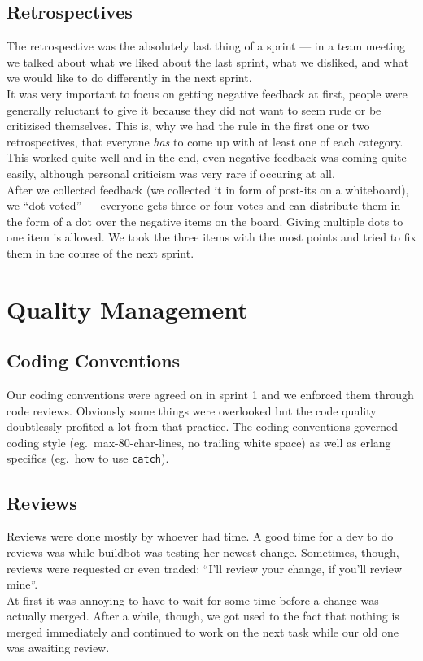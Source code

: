 \documentclass[11pt,a4paper]{report}
\begin{document}
\subsection{Retrospectives}
The retrospective was the absolutely last thing of a sprint --- in a team
meeting we talked about what we liked about the last sprint, what we disliked,
and what we would like to do differently in the next sprint. \\
It was very important to focus on getting negative feedback at first, people
were generally reluctant to give it because they did not want to seem rude or
be critizised themselves. This is, why we had the rule in the first one or two
retrospectives, that everyone {\em has\/} to come up with at least one of each
category. This worked quite well and in the end, even negative feedback was
coming quite easily, although personal criticism was very rare if occuring at
all. \\
After we collected feedback (we collected it in form of post-its on a
whiteboard), we ``dot-voted'' --- everyone gets three or four votes and can
distribute them in the form of a dot over the negative items on the board.
Giving multiple dots to one item is allowed. We took the three items with the
most points and tried to fix them in the course of the next sprint.

\section{Quality Management}
\subsection*{Coding Conventions}
Our coding conventions were agreed on in sprint 1 and we enforced them through
code reviews. Obviously some things were overlooked but the code quality
doubtlessly profited a lot from that practice.
The coding conventions governed coding style (eg.\ max-80-char-lines, no
trailing white space) as well as erlang specifics (eg.\ how to use {\tt catch}).
\subsection*{Reviews}
Reviews were done mostly by whoever had time. A good time for a dev to do
reviews was while buildbot was testing her newest change. Sometimes, though,
reviews were requested or even traded: ``I'll review your change, if you'll
review mine''. \\
At first it was annoying to have to wait for some time before a change was
actually merged. After a while, though, we got used to the fact that nothing is
merged immediately and continued to work on the next task while our old one was
awaiting review.
\end{document}
